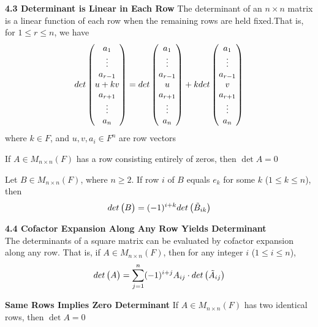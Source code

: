 \documentclass[11pt]{article}
\begin{document}
\begin{theorem*}
    \textbf{4.3 Determinant is Linear in Each Row} The determinant of an $n\times n$ matrix is a linear function of each row when the remaining rows are held fixed.That is, for $1\leq r \leq n$, we have 
    \[
        \det{a_1 \\ \vdots \\ a_{r-1} \\ u+kv \\ a_{r+1} \\ \vdots \\ a_n}
        = 
        \det{a_1 \\ \vdots \\ a_{r-1} \\ u \\ a_{r+1} \\ \vdots \\ a_n} 
        + 
        k\det{a_1 \\ \vdots \\ a_{r-1} \\ v \\ a_{r+1} \\ \vdots \\ a_n}
    \]
    where $k\in F$, and $u,v,a_i \in F^n$ are row vectors
\end{theorem*}


\begin{corollary*}
    If $A\in M_{n\times n}(F)$ has a row consisting entirely of zeros, then $\det{A}=0$
\end{corollary*}

\begin{lemma*}
    Let $B\in M_{n\times n}(F)$, where $n\geq 2$. If row $i$ of $B$ equals $e_k$ for some $k$ ($1\leq k \leq n$), then 
    \[
        \det{B} = (-1)^{i+k} \det{\minormatr{B}{ik}}    
    \]
\end{lemma*}

\begin{theorem*}
    \textbf{4.4 Cofactor Expansion Along Any Row Yields Determinant} \\
    The determinants of a square matrix can be evaluated by cofactor expansion along any row. That is, if $A\in M_{n\times n}(F)$, then for any integer $i$ ($1\leq i\leq n$), 
    \[
        \det{A} = \sum_{j=1}^n (-1)^{i+j} A_{ij}\cdot \det{\minormatr{A}{ij}}    
    \]
\end{theorem*}

\begin{corollary*}
    \textbf{Same Rows Implies Zero Determinant} If $A\in M_{n\times n}(F)$ has two identical rows, then $\det{A}=0$ 
\end{corollary*}
\end{document}

